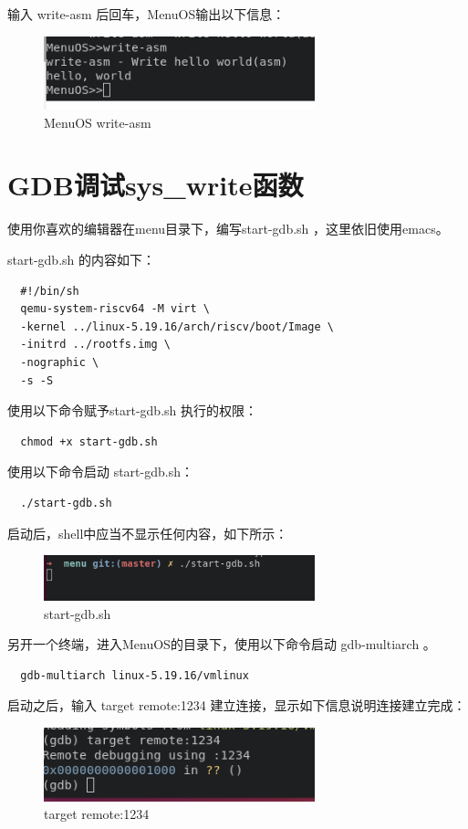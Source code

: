 \documentclass[lang=cn,10pt]{elegantbook}
\begin{document}
输入 write-asm 后回车，MenuOS输出以下信息：
\begin{figure}[htbp]
  \centering
  \includegraphics[width=0.7\textwidth]{image/image-20231105213246034.png}
  \caption{MenuOS write-asm}
\end{figure}

\section{GDB调试sys\_write函数}
使用你喜欢的编辑器在menu目录下，编写start-gdb.sh ，这里依旧使用emacs。

start-gdb.sh 的内容如下：

\begin{lstlisting}
  #!/bin/sh
  qemu-system-riscv64 -M virt \
  -kernel ../linux-5.19.16/arch/riscv/boot/Image \
  -initrd ../rootfs.img \
  -nographic \
  -s -S
\end{lstlisting}

使用以下命令赋予start-gdb.sh 执行的权限：

\begin{lstlisting}
  chmod +x start-gdb.sh
\end{lstlisting}
使用以下命令启动 start-gdb.sh：

\begin{lstlisting}
  ./start-gdb.sh
\end{lstlisting}
启动后，shell中应当不显示任何内容，如下所示：
\begin{figure}[htbp]
  \centering
  \includegraphics[width=0.7\textwidth]{image/image-20231105221503598.png}
  \caption{start-gdb.sh}
\end{figure}

另开一个终端，进入MenuOS的目录下，使用以下命令启动 gdb-multiarch  。
\begin{lstlisting}
  gdb-multiarch linux-5.19.16/vmlinux
\end{lstlisting}
启动之后，输入 target remote:1234 建立连接，显示如下信息说明连接建立完成：
\begin{figure}[htbp]
  \centering
  \includegraphics[width=0.7\textwidth]{image/image-20231105221724247.png}
  \caption{target remote:1234}
\end{figure}
\end{document}
